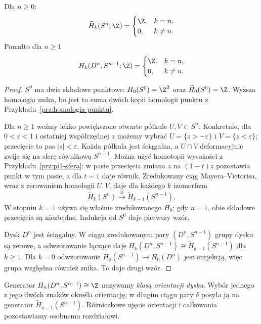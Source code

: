 \begin{twierdzenie}
\label{thm:homologia-sfer}
Dla $n\geq0$:
\[
 \widetilde H_k(S^n;\Z)=
 \begin{cases}\Z,&k=n,\\0,&k\ne n.\end{cases}
\]
Ponadto dla $n\geq1$
\[
 H_k(D^n,S^{n-1};\Z)=
 \begin{cases}\Z,&k=n,\\0,&k\ne n.\end{cases}
\]
\end{twierdzenie}
\begin{proof}
$S^0$ ma dwie składowe punktowe:
$H_0(S^0)=\Z^2$ oraz
$\widetilde H_0(S^0)=\Z$.
Wyższa homologia znika, bo jest
to suma dwóch kopii homologii
punktu z Przykładu~\ref{prz:homologia-punktu}.

Dla $n\geq1$ weźmy lekko
powiększone otwarte półkule
$U,V\subset S^n$. Konkretnie, dla $0<\varepsilon<1$ i ostatniej
współrzędnej $z$ możemy wybrać $U=\{z>-\varepsilon\}$
i $V=\{z<\varepsilon\}$; przecięcie to pas $|z|<\varepsilon$.
Każda półkula jest
ściągalna, a $U\cap V$
deformacyjnie zwija się na
sferę równikową $S^{n-1}$.
Można użyć homotopii wysokości z
Przykładu~\ref{prz:pi1-sfera}: w pasie przecięcia
zmiana $z$ na $(1-t)z$ pozostawia punkt w tym pasie,
a dla $t=1$ daje równik.
Zredukowany ciąg
Mayera--Vietorisa, wraz z
zerowaniem homologii $U,V$,
daje dla każdego $k$ izomorfizm
\[
 \widetilde H_k(S^n)
 \xrightarrow{\ \cong\ }
 \widetilde H_{k-1}(S^{n-1}).
\]
W stopniu $k=1$ używa się
właśnie zredukowanego $H_0$;
gdy $n=1$, obie składowe
przecięcia są niezbędne.
Indukcja od $S^0$ daje pierwszy wzór.

Dysk $D^n$ jest ściągalny. W ciągu
zredukowanym pary $(D^n,S^{n-1})$
grupy dysku są zerowe, a odwzorowanie
łączące daje
$H_k(D^n,S^{n-1})\cong
\widetilde H_{k-1}(S^{n-1})$
dla $k\geq1$. Dla $k=0$
odwzorowanie $H_0(S^{n-1})\to H_0(D^n)$
jest surjekcją, więc grupa
względna również znika.
To daje drugi wzór.
\end{proof}

\begin{uwaga}
Generator $H_n(D^n,S^{n-1})\cong\Z$
nazywamy \emph{klasą orientacji dysku}.
Wybór jednego z jego dwóch znaków
określa orientację; w długim ciągu
pary $\delta$ posyła ją na
generator $\widetilde H_{n-1}(S^{n-1})$.
Różniczkowe ujęcie orientacji
i całkowania pozostawiamy
osobnemu rozdziałowi.
\end{uwaga}

